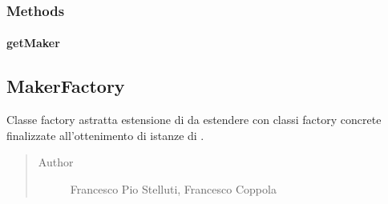 \documentclass[letterpaper,10pt,italian,openany,oneside]{sphinxmanual}
\begin{document}
\subsubsection{Methods}
\label{\detokenize{source/it/unicam/cs/pa/mastermind/factories/InteractiveMakerFactory:methods}}

\paragraph{getMaker}
\label{\detokenize{source/it/unicam/cs/pa/mastermind/factories/InteractiveMakerFactory:getmaker}}

\begin{fulllineitems}
\label{\detokenize{source/it/unicam/cs/pa/mastermind/factories/InteractiveMakerFactory:it.unicam.cs.pa.mastermind.factories.InteractiveMakerFactory.getMaker()}}
\end{fulllineitems}



\subsection{MakerFactory}
\label{\detokenize{source/it/unicam/cs/pa/mastermind/factories/MakerFactory:makerfactory}}\label{\detokenize{source/it/unicam/cs/pa/mastermind/factories/MakerFactory::doc}}

\begin{fulllineitems}
\label{\detokenize{source/it/unicam/cs/pa/mastermind/factories/MakerFactory:it.unicam.cs.pa.mastermind.factories.MakerFactory}}
Classe factory astratta estensione di  da estendere con classi factory concrete finalizzate all’ottenimento di istanze di .
\begin{quote}\begin{description}
\item[{Author}] \leavevmode
Francesco Pio Stelluti, Francesco Coppola

\end{description}\end{quote}

\end{fulllineitems}
\end{document}
